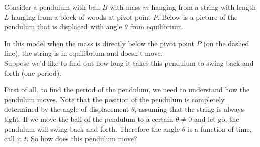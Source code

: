 \documentclass[handout,nooutcomes]{ximera}
\begin{document}
\begin{example}
Consider a pendulum with ball $B$ with mass $m$ hanging from a string
with length $L$ hanging from a block of woods at pivot point $P$.
Below is a picture of the pendulum that is displaced with angle
$\theta$ from equilibrium.\\

\begin{center}
\usetikzlibrary{calc,patterns,angles,quotes}
\end{center}

In this model when the mass is directly below the pivot point $P$
(on the dashed line), the string is in equilibrium and doesn't move.\\

Suppose we'd like to find out how long it takes this pendulum
to swing back and forth (one period).\\

\begin{explanation}
First of all, to find the period of the pendulum, we need to understand
how the pendulum moves. Note that the position of the pendulum is completely determined
by the angle of displacement $\theta$, assuming that the string is always tight.
If we move the ball of the pendulum to a certain $\theta\neq 0$ and let go,
the pendulum will swing back and forth. Therefore the angle $\theta$
is a function of time, call it $t$. So how does this pendulum move?\\


\end{explanation}
\end{example}
\end{document}
